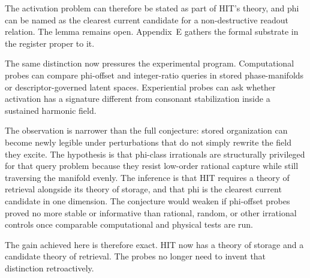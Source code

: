 The activation problem can therefore be stated as part of HIT's theory, and phi can be named as the clearest current candidate for a non-destructive readout relation. The lemma remains open. Appendix~E gathers the formal substrate in the register proper to it.

The same distinction now pressures the experimental program. Computational probes can compare phi-offset and integer-ratio queries in stored phase-manifolds or descriptor-governed latent spaces. Experiential probes can ask whether activation has a signature different from consonant stabilization inside a sustained harmonic field.

The observation is narrower than the full conjecture: stored organization can become newly legible under perturbations that do not simply rewrite the field they excite. The hypothesis is that phi-class irrationals are structurally privileged for that query problem because they resist low-order rational capture while still traversing the manifold evenly. The inference is that HIT requires a theory of retrieval alongside its theory of storage, and that phi is the clearest current candidate in one dimension. The conjecture would weaken if phi-offset probes proved no more stable or informative than rational, random, or other irrational controls once comparable computational and physical tests are run.

The gain achieved here is therefore exact. HIT now has a theory of storage and a candidate theory of retrieval. The probes no longer need to invent that distinction retroactively.
